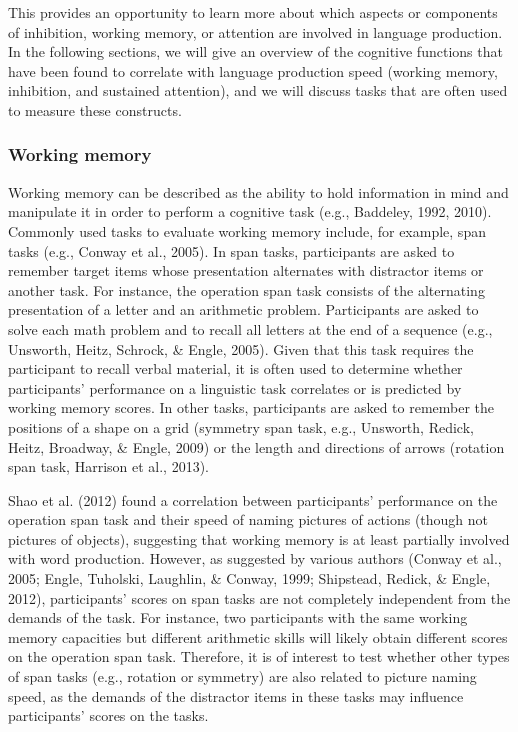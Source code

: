 \documentclass[
  man,floatsintext]{apa6}
\begin{document}
This provides an opportunity to learn more about which aspects or components of inhibition, working memory, or attention are involved in language production. In the following sections, we will give an overview of the cognitive functions that have been found to correlate with language production speed (working memory, inhibition, and sustained attention), and we will discuss tasks that are often used to measure these constructs.

\hypertarget{working-memory}{%
\subsubsection{Working memory}\label{working-memory}}

Working memory can be described as the ability to hold information in mind and manipulate it in order to perform a cognitive task (e.g., Baddeley, 1992, 2010). Commonly used tasks to evaluate working memory include, for example, span tasks (e.g., Conway et al., 2005). In span tasks, participants are asked to remember target items whose presentation alternates with distractor items or another task. For instance, the operation span task consists of the alternating presentation of a letter and an arithmetic problem. Participants are asked to solve each math problem and to recall all letters at the end of a sequence (e.g., Unsworth, Heitz, Schrock, \& Engle, 2005). Given that this task requires the participant to recall verbal material, it is often used to determine whether participants' performance on a linguistic task correlates or is predicted by working memory scores. In other tasks, participants are asked to remember the positions of a shape on a grid (symmetry span task, e.g., Unsworth, Redick, Heitz, Broadway, \& Engle, 2009) or the length and directions of arrows (rotation span task, Harrison et al., 2013).

Shao et al. (2012) found a correlation between participants' performance on the operation span task and their speed of naming pictures of actions (though not pictures of objects), suggesting that working memory is at least partially involved with word production. However, as suggested by various authors (Conway et al., 2005; Engle, Tuholski, Laughlin, \& Conway, 1999; Shipstead, Redick, \& Engle, 2012), participants' scores on span tasks are not completely independent from the demands of the task. For instance, two participants with the same working memory capacities but different arithmetic skills will likely obtain different scores on the operation span task. Therefore, it is of interest to test whether other types of span tasks (e.g., rotation or symmetry) are also related to picture naming speed, as the demands of the distractor items in these tasks may influence participants' scores on the tasks.
\end{document}
